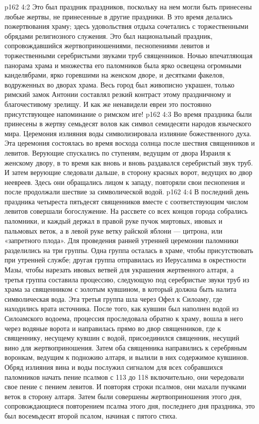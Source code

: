 \vs p162 4:2 Это был праздник праздников, поскольку на нем могли быть принесены любые жертвы, не принесенные в другие праздники. В это время делались пожертвования храму; здесь удовольствия отдыха сочетались с торжественными обрядами религиозного служения. Это был национальный праздник, сопровождавшийся жертвоприношениями, песнопениями левитов и торжественными серебристыми звуками труб священников. Ночью впечатляющая панорама храма и множества его паломников была ярко освещена огромными канделябрами, ярко горевшими на женском дворе, и десятками факелов, водруженных во дворах храма. Весь город был живописно украшен, только римский замок Антонии составлял резкий контраст этому праздничному и благочестивому зрелищу. И как же ненавидели евреи это постоянно присутствующее напоминание о римском иге!
\vs p162 4:3 Во время праздника были принесены в жертву семьдесят волов как символ семидесяти народов языческого мира. Церемония излияния воды символизировала излияние божественного духа. Эта церемония состоялась во время восхода солнца после шествия священников и левитов. Верующие спускались по ступеням, ведущим от двора Израиля к женскому двору, в то время как вновь и вновь раздавался серебристый звук труб. И затем верующие следовали дальше, в сторону красных ворот, ведущих во двор неевреев. Здесь они обращались лицом к западу, повторяли свои песнопения и после продолжали шествие за символической водой.
\vs p162 4:4 \pc В последний день праздника четыреста пятьдесят священников вместе с соответствующим числом левитов совершали богослужение. На рассвете со всех концов города собрались паломники, и каждый держал в правой руке пучок миртовых, ивовых и пальмовых веток, а в левой руке ветку райской яблони --- цитрона, или «запретного плода». Для проведения ранней утренней церемонии паломники разделились на три группы. Одна группа осталась в храме, чтобы присутствовать при утренней службе; другая группа отправилась из Иерусалима в окрестности Мазы, чтобы нарезать ивовых ветвей для украшения жертвенного алтаря, а третья группа составила процессию, следующую под серебристые звуки труб из храма за священником с золотым кувшином, в который должна быть налита символическая вода. Эта третья группа шла через Офел к Силоаму, где находились врата источника. После того, как кувшин был наполнен водой из Силоамского водоема, процессия проследовала обратно к храму, вошла в него через водяные ворота и направилась прямо во двор священников, где к священнику, несущему кувшин с водой, присоединился священник, несущий вино для жертвоприношения. Затем оба священника направились к серебряным воронкам, ведущим к подножию алтаря, и вылили в них содержимое кувшинов. Обряд излияния вина и воды послужил сигналом для всех собравшихся паломников начать пение псалмов с 113 до 118 включительно, они чередовали свое пение с пением левитов. И повторяя строки псалмов, они махали пучками веток в сторону алтаря. Затем были совершены жертвоприношения этого дня, сопровождающиеся повторением псалма этого дня, последнего дня праздника, это был восемьдесят второй псалом, начиная с пятого стиха.
